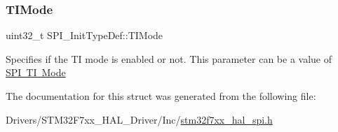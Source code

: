 \subsubsection{\texorpdfstring{TIMode}{TIMode}}
{\footnotesize\ttfamily uint32\+\_\+t S\+P\+I\+\_\+\+Init\+Type\+Def\+::\+T\+I\+Mode}

Specifies if the TI mode is enabled or not. This parameter can be a value of \mbox{\hyperlink{group___s_p_i___t_i__mode}{S\+PI TI Mode}} 

The documentation for this struct was generated from the following file\+:\begin{DoxyCompactItemize}
\item 
Drivers/\+S\+T\+M32\+F7xx\+\_\+\+H\+A\+L\+\_\+\+Driver/\+Inc/\mbox{\hyperlink{stm32f7xx__hal__spi_8h}{stm32f7xx\+\_\+hal\+\_\+spi.\+h}}\end{DoxyCompactItemize}
